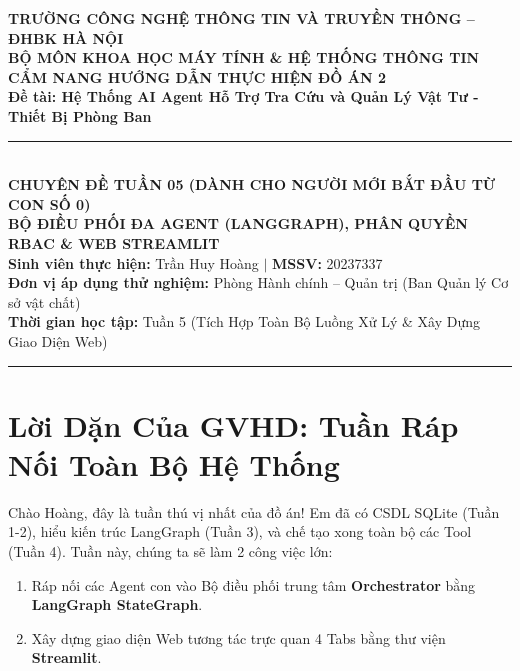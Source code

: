 \documentclass[11pt,a4paper]{article}
\begin{document}
\begin{center}
    {\large \textbf{TRƯỜNG CÔNG NGHỆ THÔNG TIN VÀ TRUYỀN THÔNG -- ĐHBK HÀ NỘI}}\\[0.2em]
    {\normalsize \textbf{BỘ MÔN KHOA HỌC MÁY TÍNH \& HỆ THỐNG THÔNG TIN}}\\[1.0em]
    
    {\Large \bfseries \color{blue!85!black} CẨM NANG HƯỚNG DẪN THỰC HIỆN ĐỒ ÁN 2}\\[0.3em]
    {\large \textbf{Đề tài: Hệ Thống AI Agent Hỗ Trợ Tra Cứu và Quản Lý Vật Tư - Thiết Bị Phòng Ban}}\\[0.8em]
    
    \rule{0.85\textwidth}{0.8pt}\\[0.6em]
    
    {\bfseries CHUYÊN ĐỀ TUẦN 05 (DÀNH CHO NGƯỜI MỚI BẮT ĐẦU TỪ CON SỐ 0)}\\[0.3em]
    {\large \bfseries BỘ ĐIỀU PHỐI ĐA AGENT (LANGGRAPH), PHÂN QUYỀN RBAC \& WEB STREAMLIT}\\[0.8em]
    
    \small
    \textbf{Sinh viên thực hiện:} Trần Huy Hoàng \quad $\vert$ \quad \textbf{MSSV:} 20237337\\
    \textbf{Đơn vị áp dụng thử nghiệm:} Phòng Hành chính -- Quản trị (Ban Quản lý Cơ sở vật chất)\\
    \textbf{Thời gian học tập:} Tuần 5 (Tích Hợp Toàn Bộ Luồng Xử Lý \& Xây Dựng Giao Diện Web)
\end{center}

\vspace{0.2cm}
\hrule
\vspace{0.3cm}

\section{Lời Dặn Của GVHD: Tuần Ráp Nối Toàn Bộ Hệ Thống}

Chào Hoàng, đây là tuần thú vị nhất của đồ án! Em đã có CSDL SQLite (Tuần 1-2), hiểu kiến trúc LangGraph (Tuần 3), và chế tạo xong toàn bộ các Tool (Tuần 4). Tuần này, chúng ta sẽ làm 2 công việc lớn:
\begin{enumerate}
    \item Ráp nối các Agent con vào Bộ điều phối trung tâm \textbf{Orchestrator} bằng \textbf{LangGraph StateGraph}.
    \item Xây dựng giao diện Web tương tác trực quan 4 Tabs bằng thư viện \textbf{Streamlit}.
\end{enumerate}
\end{document}
